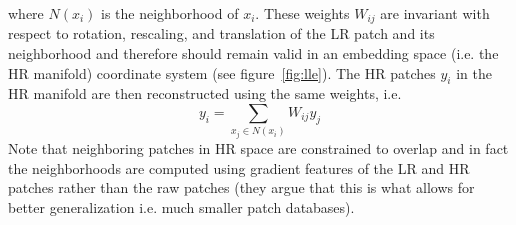 where $N(x_i)$ is the neighborhood of $x_i$.
%
These weights $W_{ij}$ are invariant with respect to rotation, rescaling, and translation of the LR patch and its neighborhood\cite{saul2000introduction} and therefore should remain valid in an embedding space (i.e. the HR manifold) coordinate system (see figure~\ref{fig:lle}).
%
The HR patches $y_i$ in the HR manifold are then reconstructed using the same weights, i.e.
\begin{equation}
    y_i = \sum_{x_j \in N(x_i)} W_{ij} y_j
\end{equation}
%
Note that neighboring patches in HR space are constrained to overlap and in fact the neighborhoods are computed using gradient features of the LR and HR patches rather than the raw patches (they argue that this is what allows for better generalization i.e. much smaller patch databases).

